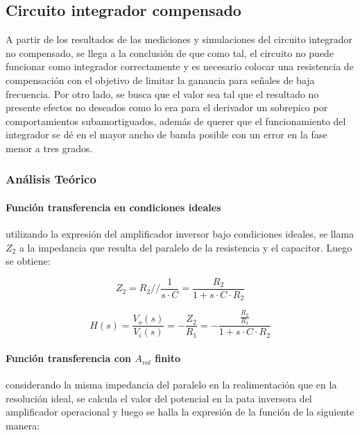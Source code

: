	\subsection{Circuito integrador compensado}
A partir de los resultados de las mediciones y simulaciones del circuito integrador no compensado, se llega a la conclusi\'on de que como tal, el circuito no puede funcionar como integrador correctamente
y es necesario colocar una resistencia de compensaci\'on con el objetivo de limitar la ganancia para se\~nales de baja frecuencia. Por otro lado, se busca que el valor sea tal que el resultado no presente efectos no deseados como lo era para
el derivador un sobrepico por comportamientos subamortiguados, adem\'as de querer que el funcionamiento del integrador se d\'e en el mayor ancho de banda posible con un error en la fase menor a tres grados.

\subsubsection{An\'alisis Te\'orico}

\paragraph*{Funci\'on transferencia en condiciones ideales} utilizando la expresi\'on del amplificador inversor bajo condiciones ideales, se llama $Z_2$ a la impedancia que resulta del paralelo de la resistencia y el capacitor. Luego se obtiene:

\begin{equation*}
	Z_2 = R_2 // \frac{1}{s \cdot C} = \frac{R_2}{1 + s \cdot C \cdot R_2}
\end{equation*}

\begin{equation}
	H(s) = \frac{V_o(s)}{V_i(s)} = - \frac{Z_2}{R_1} = - \frac{\frac{R_2}{R_1}}{1 + s \cdot C \cdot R_2}
	\label{eq:integrador_compensado_transfer_ideal}
\end{equation}

\paragraph*{Funci\'on transferencia con $A_{vol}$ finito} considerando la misma impedancia del paralelo en la realimentaci\'on que en la resoluci\'on ideal, se calcula el valor del potencial en la pata inversora del amplificador operacional y luego se halla la expresi\'on de la funci\'on de la siguiente manera:

